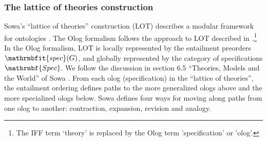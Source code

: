 \documentclass{amsart}
\theoremstyle{remark}
\theoremstyle{definition}
\begin{document}
\subsubsection{The lattice of theories construction}\label{sec:LOT}

Sowa's ``lattice of theories'' construction (LOT) describes a modular framework for ontologies \cite{S:KR}.
The Olog formalism follows the approach to LOT described in \cite{IFF:LOT}.\footnote{The IFF term `theory' is replaced by the Olog term 'specification' or 'olog'.}
In the Olog formalism, 
LOT is 
locally represented by the entailment preorders $\mathrmbfit{spec}(G)$,
and globally represented by the category of specifications $\mathrmbf{Spec}$.
We follow the discussion in section 6.5 ``Theories, Models and the World'' of Sowa \cite{S:KR}. 
From each olog (specification) in the ``lattice of theories'', 
the entailment ordering defines paths 
to the more generalized ologs above and the more specialized ologs below.
Sowa defines four ways for moving along paths from one olog to another: contraction, expansion, revision and analogy.
%
\end{document}
